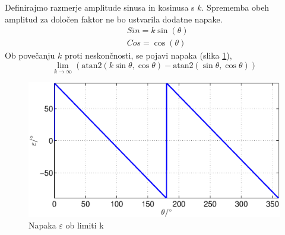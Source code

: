\documentclass[a4paper]{article}
\begin{document}
Definirajmo razmerje amplitude sinusa in kosinusa s $k$. Sprememba obeh amplitud za določen faktor ne bo ustvarila dodatne napake.
	\begin{eqnarray}
	\label{equ:def_sin_ama}
	&Sin = k \sin(\theta)\\
	\label{equ:def_cos_amp}
	&Cos =\cos(\theta)
	\end{eqnarray}
Ob povečanju $k$ proti neskončnosti, se pojavi napaka (slika \ref{fig:lim_amp}),
\begin{equation}
\label{equ:amp_lim}
\lim_{k \rightarrow \infty} (\mathrm{atan2}(k \sin{\theta},\cos{\theta})-\mathrm{atan2}(\sin{\theta},\cos{\theta}))
\end{equation}
\begin{figure}[!htb]
	\begin{center}
		\includegraphics[width=\linewidth]{./Slike/lim_amp.eps}
		\caption{Napaka $\varepsilon$ ob limiti k} \label{fig:lim_amp}
	\end{center}
\end{figure}
\end{document}
